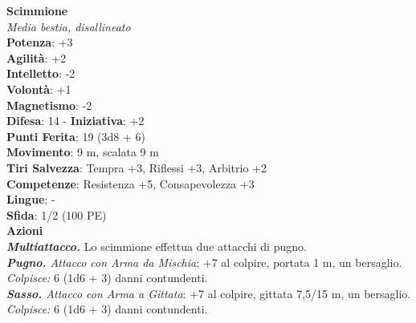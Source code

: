 \begin{multicols}{2}
\medskip\textbf{Scimmione}\\
\emph{Media bestia, disallineato}\\
\textbf{Potenza}: +3\\
\textbf{Agilità}: +2\\
\textbf{Intelletto}: -2\\
\textbf{Volontà}: +1\\
\textbf{Magnetismo}: -2\\
\textbf{Difesa}: 14 - \textbf{Iniziativa}: +2\\
\textbf{Punti Ferita}: 19 (3d8 + 6)\\
\textbf{Movimento}: 9 m, scalata 9 m\\
\textbf{Tiri Salvezza}: Tempra +3, Riflessi +3, Arbitrio +2\\
\textbf{Competenze}: Resistenza +5, Consapevolezza +3\\
\textbf{Lingue}: -\\
\textbf{Sfida}: 1/2 (100 PE)\smallskip\\
\smallskip\textbf{Azioni}\\
\emph{\textbf{Multiattacco.}} Lo scimmione effettua due attacchi di pugno.\\
\emph{\textbf{Pugno.} Attacco con Arma da Mischia}: +7 al colpire, portata 1 m, un bersaglio.\\
\emph{Colpisce:} 6 (1d6 + 3) danni contundenti.\\
\emph{\textbf{Sasso.} Attacco con Arma a Gittata}: +7 al colpire, gittata 7,5/15 m, un bersaglio.\\
\emph{Colpisce:} 6 (1d6 + 3) danni contundenti.\\


\end{multicols}
